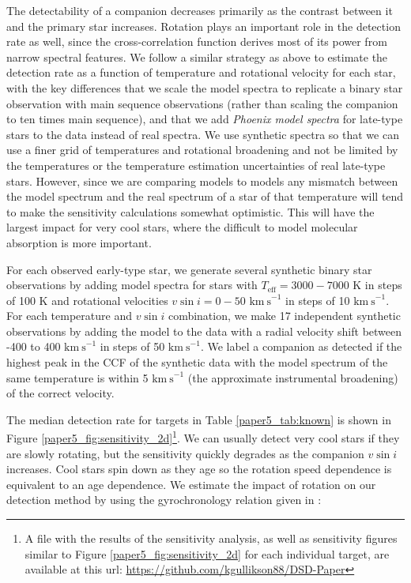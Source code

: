 The detectability of a companion decreases primarily as the contrast between it and the primary star increases. Rotation plays an important role in the detection rate as well, since the cross-correlation function derives most of its power from narrow spectral features. We follow a similar strategy as above to estimate the detection rate as a function of temperature and rotational velocity for each star, with the key differences that we scale the model spectra to replicate a binary star observation with main sequence observations (rather than scaling the companion to ten times main sequence), and that we add \emph{Phoenix model spectra} for late-type stars to the data instead of real spectra. We use synthetic spectra so that we can use a finer grid of temperatures and rotational broadening and not be limited by the temperatures or the temperature estimation uncertainties of real late-type stars. However, since we are comparing models to models any mismatch between the model spectrum and the real spectrum of a star of that temperature will tend to make the sensitivity calculations somewhat optimistic. This will have the largest impact for very cool stars, where the difficult to model molecular absorption is more important.

For each observed early-type star, we generate several synthetic binary star observations by adding model spectra for stars with $T_\mathrm{eff} = 3000 - 7000$ K in steps of 100 K and rotational velocities $v\sin{i} = 0 - 50$ $\mathrm{km\ s}^{-1}$ in steps of 10 $\mathrm{km\ s}^{-1}$. For each temperature and $v\sin{i}$ combination, we make 17 independent synthetic observations by adding the model to the data with a radial velocity shift between -400 to 400 $\mathrm{km\ s}^{-1}$ in steps of 50 $\mathrm{km\ s}^{-1}$. We label a companion as detected if the highest peak in the CCF of the synthetic data with the model spectrum of the same temperature is within 5 $\mathrm{km\ s}^{-1}$ (the approximate instrumental broadening) of the correct velocity. 

The median detection rate for targets in Table \ref{paper5_tab:known} is shown in Figure \ref{paper5_fig:sensitivity_2d}\footnote{A file with the results of the sensitivity analysis, as well as sensitivity figures similar to Figure \ref{paper5_fig:sensitivity_2d} for each individual target, are available at this url: \url{https://github.com/kgullikson88/DSD-Paper}}. We can usually detect very cool stars if they are slowly rotating, but the sensitivity quickly degrades as the companion $v\sin{i}$ increases. Cool stars spin down as they age \citep{Barnes2003} so the rotation speed dependence is equivalent to an age dependence. We estimate the impact of rotation on our detection method by using the gyrochronology relation given in \cite{Barnes2010b}: 

